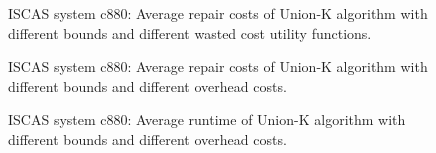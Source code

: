 \documentclass[review]{elsarticle}
\newcommand\meir[1]{\textcolor{red}{meir: #1}}
\begin{document}
\begin{figure}{}
  \caption{%
  ISCAS system c880: Average repair costs of Union-K algorithm with different bounds and different wasted cost utility functions.
  }
  \label{fig:I-obj}
\end{figure}

\begin{figure}{}
  \caption{%
  ISCAS system c880: Average repair costs of Union-K algorithm with different bounds and different overhead costs.}
  \label{fig:I-bounds}
\end{figure}

\begin{figure}{}
  \caption{ISCAS system c880: Average runtime of Union-K algorithm with different bounds and different overhead costs.}
  \label{fig:I-bounds_runtime}
\end{figure}
\end{document}
